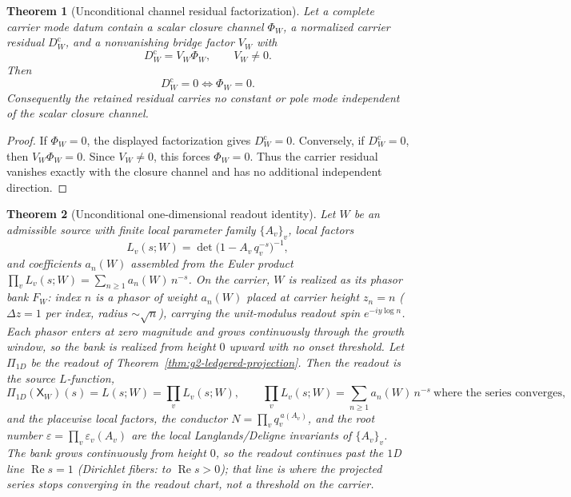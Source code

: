 \documentclass[11pt]{article}
\newtheorem{theorem}{Theorem}
\theoremstyle{definition}
\renewcommand{\Re}{\operatorname{Re}}
\begin{document}
\begin{theorem}[Unconditional channel residual factorization]\label{thm:g6-channel-residual-factorization}
Let a complete carrier mode datum contain a scalar closure channel
\(\Phi_W\), a normalized carrier residual \(D_W^{\mathrm c}\), and a
nonvanishing bridge factor \(V_W\) with
\[
D_W^{\mathrm c}=V_W\Phi_W,\qquad V_W\ne0.
\]
Then
\[
D_W^{\mathrm c}=0\iff \Phi_W=0.
\]
Consequently the retained residual carries no constant or pole mode
independent of the scalar closure channel.
\end{theorem}

\begin{proof}
If \(\Phi_W=0\), the displayed factorization gives
\(D_W^{\mathrm c}=0\).  Conversely, if \(D_W^{\mathrm c}=0\), then
\(V_W\Phi_W=0\).  Since \(V_W\ne0\), this forces \(\Phi_W=0\).  Thus the
carrier residual vanishes exactly with the closure channel and has no
additional independent direction.
\end{proof}

\begin{theorem}[Unconditional one-dimensional readout identity]\label{thm:g7-readout-identity}
Let \(W\) be an admissible source with finite local parameter family
\(\{A_v\}_v\), local factors
\[
L_v(s;W)=\det\!\bigl(1-A_v\,q_v^{-s}\bigr)^{-1},
\]
and coefficients \(a_n(W)\) assembled from the Euler product
\(\prod_v L_v(s;W)=\sum_{n\ge1}a_n(W)\,n^{-s}\).  On the carrier, \(W\) is
realized as its phasor bank \(F_W\): index \(n\) is a phasor of weight
\(a_n(W)\) placed at carrier height \(z_n=n\) (\(\Delta z=1\) per index, radius
\(\sim\sqrt n\)), carrying the unit-modulus readout spin \(e^{-iy\log n}\).
Each phasor enters at zero magnitude and grows continuously through the growth
window, so the bank is realized from height \(0\) upward with no onset
threshold.  Let \(\Pi_{1D}\) be the readout of
Theorem~\ref{thm:g2-ledgered-projection}.  Then the readout is the source
\(L\)-function,
\[
\Pi_{1D}(\mathsf X_W)(s)=L(s;W)=\prod_v L_v(s;W),
\qquad
\prod_v L_v(s;W)=\sum_{n\ge1}a_n(W)\,n^{-s}\ \text{where the series converges,}
\]
and the placewise local factors, the conductor \(N=\prod_v q_v^{\,a(A_v)}\), and
the root number \(\varepsilon=\prod_v\varepsilon_v(A_v)\) are the local
Langlands/Deligne invariants of \(\{A_v\}_v\).  The bank grows continuously from
height \(0\), so the readout continues past the \(1\)D line \(\Re s=1\)
(Dirichlet fibers: to \(\Re s>0\)); that line is where the projected series
stops converging in the readout chart, not a threshold on the carrier.
\end{theorem}
\end{document}

